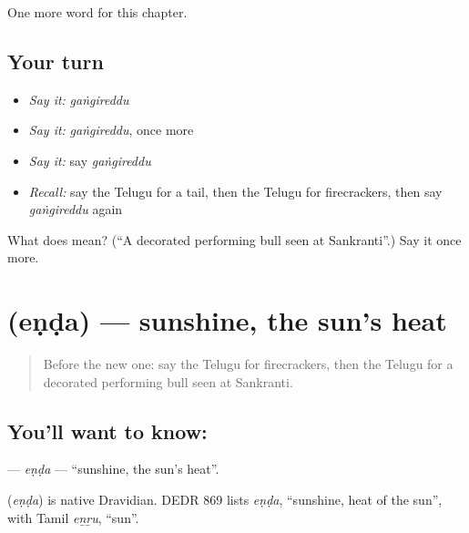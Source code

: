 \begin{grammarlens}[title={What you've built}]
One more word for this chapter.
\end{grammarlens}

\subsection*{Your turn}
\begin{itemize}
\raggedright
  \item \emph{Say it:} \emph{gaṅgireddu}
  \item \emph{Say it:} \emph{gaṅgireddu}, once more
  \item \emph{Say it:} say \emph{gaṅgireddu}
  \item \emph{Recall:} say the Telugu for a tail, then the Telugu for firecrackers, then say \emph{gaṅgireddu} again
\end{itemize}

\begin{tcolorbox}[breakable,colback=teal!4,colframe=teal!35!black,title={Before you move on}]
What does  mean? (\textquotedblleft{}A decorated performing bull seen at Sankranti\textquotedblright{}.) Say it once more.
\end{tcolorbox}
\section[\texorpdfstring{\te{ఎండ} (eṇḍa)}{ఎండ (eṇḍa)}]{ (eṇḍa) — sunshine, the sun's heat}

\label{lesson:TE-C229-enda}



\begin{quote}
Before the new one: say the Telugu for firecrackers, then the Telugu for a decorated performing bull seen at Sankranti.
\end{quote}

\subsection*{You'll want to know: }
\textbf{} — \emph{eṇḍa} — \textquotedblleft{}sunshine, the sun's heat\textquotedblright{}.

\begin{cousinweb}
\textbf{} (\emph{eṇḍa}) is native Dravidian. DEDR 869 lists \emph{eṇḍa}, \textquotedblleft{}sunshine, heat of the sun\textquotedblright{}, with Tamil \emph{eṉṟu}, \textquotedblleft{}sun\textquotedblright{}.
\end{cousinweb}

